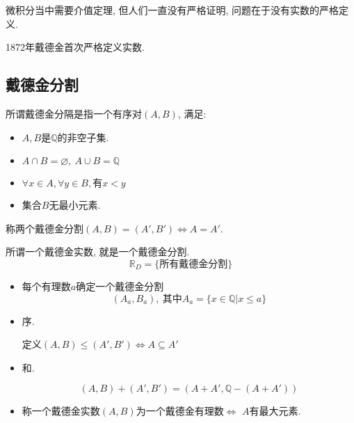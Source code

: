 微积分当中需要介值定理, 但人们一直没有严格证明, 问题在于没有实数的严格定义.

1872年戴德金首次严格定义实数.

\subsection{戴德金分割}

\begin{definition}
    所谓戴德金分隔是指一个有序对$(A,B)$, 满足:
    \begin{itemize}
        \item $A,B$是$\mathbb{Q}$的非空子集.
        \item $A \cap B = \varnothing, \ A \cup B = \mathbb{Q}$
        \item $\forall x\in A, \forall y\in B, \text{有} x< y$
        \item 集合$B$无最小元素.
    \end{itemize}

    称两个戴德金分割$(A,B) = (A',B') \iff A = A'$.
\end{definition}

\begin{definition}
    所谓一个戴德金实数, 就是一个戴德金分割.
    \begin{equation}
      \mathbb{R}_{D} = \{\text{所有戴德金分割}\}
    \end{equation}
\end{definition}

\begin{itemize}
    \item 每个有理数$a$确定一个戴德金分割
    \begin{equation}
      (A_a,B_a), \ \text{其中} A_a = \{x\in \mathbb{Q} | x \le a\}
    \end{equation}

    \item 序.

    定义$(A,B) \le  (A',B') \iff A \subseteq A'$
    
    \item 和.
    
    \begin{equation}
      (A,B) + (A',B') = (A+A', \mathbb{Q}-(A+A'))
    \end{equation}

    \item 称一个戴德金实数$(A,B)$为一个戴德金有理数$\iff$ $A$有最大元素.
\end{itemize}

